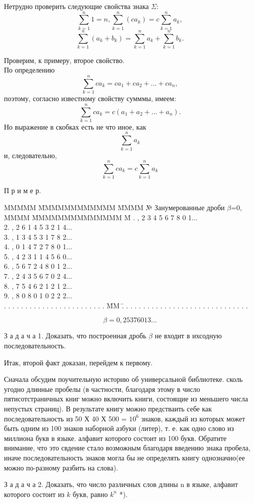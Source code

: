 \begin{multicols}{2}
Нетрудно проверить следующие свойства знака $\Sigma$:
$$\sum_{k=1}^{n} 1 = n, \sum_{k=1}^{n} (ca_k) = c \sum_{k=1}^{n} a_k,$$
$$\sum_{k=1}^{n} (a_k + b_k) = \sum_{k=1}^{n} a_k + \sum_{k=1}^{n} b_k.$$

Проверим, к примеру, второе свойство. \\
По определению
$$\sum_{k=1}^{n} ca_k = ca_1 + ca_2 + ... + ca_n,$$
поэтому, согласно известному свойству сумммы, имеем:
$$\sum_{k=1}^{n} ca_k =  c(a_1 + a_2 + ... + a_n).$$
Но выражение в скобках есть не что иное, как
$$\sum_{k=1}^{n} a_k$$
и, следовательно, 
$$\sum_{k=1}^{n} ca_k = c \sum_{k=1}^{n} a_k$$
\end{multicols}


\newpage
\setcounter{page}{5}
\begin{multicols}{2}
\setlength{\columnsep}{3cm}
\large{П р и м е р.}
\begin{tabbing}
MMMMM \= MMMMMMMMMMMM \= MMMM \kill
 \footnotesize{№} \> \footnotesize{Занумерованные дроби} \> \footnotesize{$\beta$=0,}\\
MMMM \= MMMMMMMMMMMMMM \= M . ,  2 3 4 5 6 7 8 0 1... \\
 2. , 2  6 1 4 5 3 2 1 4... \\
 3. , 1 3  4 5 3 1 7 8 2... \\
 4. , 0 1 4  7 2 7 8 0 1... \\
 5. , 4 2 3 1  1 4 5 6 0... \\
 6. , 5 6 7 2 4  8 0 1 2... \\
 7. , 2 4 3 5 6 7  0 2 4... \\
 8. , 7 5 4 6 2 1 2  1 2... \\
 9. , 8 0 8 0 1 0 2 2  2... \\
. . . . . . . . . . . . . . . . . . . . . . . . \= MM \=   . . .  \kill
. . . . . . . . . . . . . . . . . . . . . . . .  \>        \>   . . .  
\end{tabbing}
$$\beta=0,25376013...$$

З а д а ч а  1. Доказать, что построенная дробь $\beta$ не входит в ихсодную последовательность. 

Итак, второй факт доказан, перейдем к первому. 

Сначала обсудим поучительную историю об универсальной библиотеке. 
сколь угодно длинные пробелы (в частности, благодаря этому в число пятисотстраничных книг можно включить книги, состоящие из меньшего числа непустых страниц). В результате книгу можно предстваить себе как последовательность из 50 Х 40 Х 500 = $10^{6}$ знаков, каждый из которых может быть одним из 100 знаков наборной азбуки (литер), т. е. как одно слово из миллиона букв в языке. алфавит которого состоит из 100 букв. Обратите внимание, что это свдение стало возможным благодаря введению знака пробела, иначе последовательность знаков могла бы не определять книгу однозначно(ее можно по-разному разбить на слова). 

З а д а ч а  2. Доказать, что число различных слов длины n в языке, алфавит которого состоит из $k$ букв, равно $k^{n}$ *).
\end{multicols}








